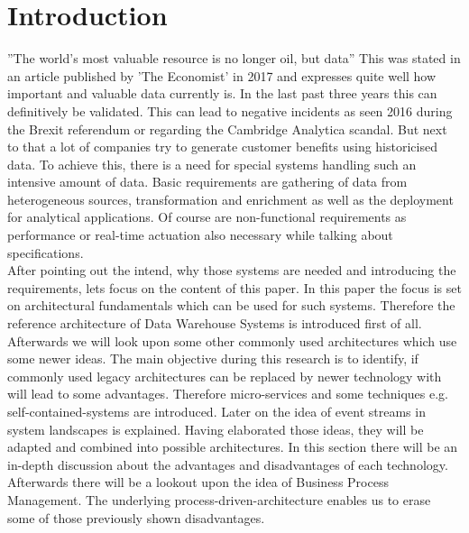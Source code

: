 \section{Introduction}
''The world’s most valuable resource is no longer oil, but data'' \cite{dataIsOil}\newline
This was stated in an article published by 'The Economist' in 2017 and expresses quite well how important and valuable data currently is. In the last past three years this can definitively be validated. This can lead to negative incidents as seen 2016 during the Brexit referendum or regarding the Cambridge Analytica scandal. But next to that a lot of companies try to generate customer benefits using historicised data.\newline
To achieve this, there is a need for special systems handling such an intensive amount of data. Basic requirements are gathering of data from heterogeneous sources, transformation and enrichment as well as the deployment for analytical applications. Of course are non-functional requirements as performance or real-time actuation also necessary while talking about specifications.\newline
\\
After pointing out the intend, why those systems are needed and introducing the requirements, lets focus on the content of this paper.\newline 
In this paper the focus is set on architectural fundamentals which can be used for such systems. Therefore the reference architecture of Data Warehouse Systems is introduced first of all. Afterwards we will look upon some other commonly used architectures which use some newer ideas.
The main objective during this research is to identify, if commonly used legacy architectures can be replaced by newer technology with will lead to some advantages.
\newline
Therefore micro-services and some techniques e.g. self-contained-systems are introduced. Later on the idea of event streams in system landscapes is explained.\newline
Having elaborated those ideas, they will be adapted and combined into possible architectures. In this section there will be an in-depth discussion about the advantages and disadvantages of each technology.\newline
Afterwards there will be a lookout upon the idea of Business Process Management. The underlying process-driven-architecture enables us to erase some of those previously shown disadvantages.\newline
